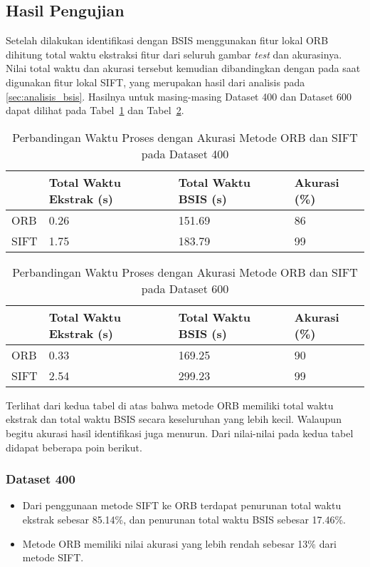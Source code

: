\subsection{Hasil Pengujian}
Setelah dilakukan identifikasi dengan BSIS menggunakan fitur lokal ORB dihitung total waktu ekstraksi fitur dari seluruh gambar \textit{test} dan akurasinya. Nilai total waktu dan akurasi tersebut kemudian dibandingkan dengan pada saat digunakan fitur lokal SIFT, yang merupakan hasil dari analisis pada \ref{sec:analisis_bsis}. Hasilnya untuk masing-masing Dataset 400 dan Dataset 600 dapat dilihat pada Tabel~\ref{tab:hasil_orb_dataset400} dan Tabel~\ref{tab:hasil_orb_dataset600}.
\begin{table}[H]
	\centering
	\begin{tabular}{|l|l|l|l|}
		\hline
		& \textbf{Total Waktu Ekstrak (s)} & \textbf{Total Waktu BSIS (s)} & \textbf{Akurasi (\%)} \\ \hline
		ORB  & 0.26                             & 151.69                        & 86                    \\ \hline
		SIFT & 1.75                             & 183.79                        & 99                    \\ \hline
	\end{tabular}
	\caption{Perbandingan Waktu Proses dengan Akurasi Metode ORB dan SIFT pada Dataset 400}
	\label{tab:hasil_orb_dataset400}
\end{table}
\begin{table}[H]
	\centering
	\begin{tabular}{|l|l|l|l|}
		\hline
		& \textbf{Total Waktu Ekstrak (s)} & \textbf{Total Waktu BSIS (s)} & \textbf{Akurasi (\%)} \\ \hline
		ORB  & 0.33                             & 169.25                        & 90                    \\ \hline
		SIFT & 2.54                             & 299.23                        & 99                    \\ \hline
	\end{tabular}
	\caption{Perbandingan Waktu Proses dengan Akurasi Metode ORB dan SIFT pada Dataset 600}
	\label{tab:hasil_orb_dataset600}
\end{table}
Terlihat dari kedua tabel di atas bahwa metode ORB memiliki total waktu ekstrak dan total waktu BSIS secara keseluruhan yang lebih kecil. Walaupun begitu akurasi hasil identifikasi juga menurun. Dari nilai-nilai pada kedua tabel didapat beberapa poin berikut.
\subsubsection{Dataset 400}
\begin{itemize}
	\item Dari penggunaan metode SIFT ke ORB terdapat penurunan total waktu ekstrak sebesar 85.14\%, dan penurunan total waktu BSIS sebesar 17.46\%.
	\item Metode ORB memiliki nilai akurasi yang lebih rendah sebesar 13\% dari metode SIFT.
\end{itemize}
